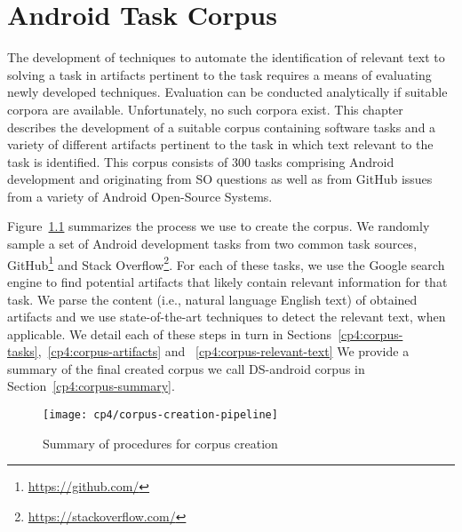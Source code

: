 \setcounter{chapter}{3}
\setcounter{rq}{1}


\chapter{Android Task Corpus}
\label{ch:android-corpus}





The development of techniques
to automate the identification of relevant text
to solving a task in artifacts
pertinent to the task requires a
means of evaluating newly developed
techniques. Evaluation can be conducted
analytically if suitable corpora are
available. Unfortunately, no such corpora
exist. This chapter describes the
development of a suitable corpus
containing
software tasks
and a variety of different artifacts pertinent
to the task in which text relevant to the
task is identified.
This corpus consists of 
300 tasks comprising Android development and originating from \acf{SO} questions
as well as from GitHub issues from a variety of Android Open-Source Systems.

Figure~\ref{fig:corpus-creation-pipeline}
summarizes the process we use to create the corpus.
We randomly sample a set of Android development tasks from two common
task sources, GitHub\footnote{\url{https://github.com/}} and Stack Overflow\footnote{\url{https://stackoverflow.com/}}.
For each of these tasks, we use the Google search engine to find potential artifacts that likely contain relevant
information for that task. 
We parse the content (i.e., natural language English text) of obtained artifacts 
and we use state-of-the-art techniques to detect the relevant text, when applicable.
We detail each of these steps in turn in 
Sections~\ref{cp4:corpus-tasks},~\ref{cp4:corpus-artifacts} and ~\ref{cp4:corpus-relevant-text}
We provide a summary of the final created corpus we call \acs{DS-android} corpus in Section~\ref{cp4:corpus-summary}.



\begin{figure}
    \centering
    \texttt{[image: cp4/corpus-creation-pipeline]}
    \caption{Summary of procedures for corpus creation}
    \label{fig:corpus-creation-pipeline}
\end{figure}

\clearpage
















